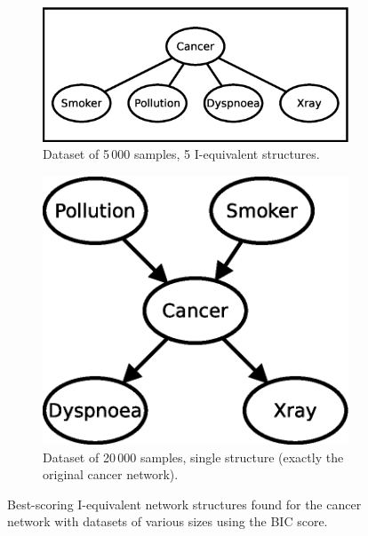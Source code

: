 \documentclass[english,cover]{fitthesis} %
\begin{document}
\begin{figure}[ht]
    \begin{subfigure}[b]{0.45\linewidth}
        \centering
        \includegraphics[scale=0.4]{fig/structure-learning-cancer-5000}
        \caption{Dataset of 5\,000 samples, 5 I-equivalent structures.}
        \label{fig:structure-learning-cancer-5000}
    \end{subfigure}
    \quad
    \begin{subfigure}[b]{0.45\linewidth}
        \centering
        \includegraphics[scale=0.4]{fig/structure-learning-cancer-20000}
        \caption{Dataset of 20\,000 samples, single structure (exactly the original cancer network).}
        \label{fig:structure-learning-cancer-20000}
    \end{subfigure}
    \caption{Best-scoring I-equivalent network structures found for the cancer network with datasets of various sizes using the BIC score.}
    \label{fig:structure-learning-cancer}
\end{figure}
\end{document}
